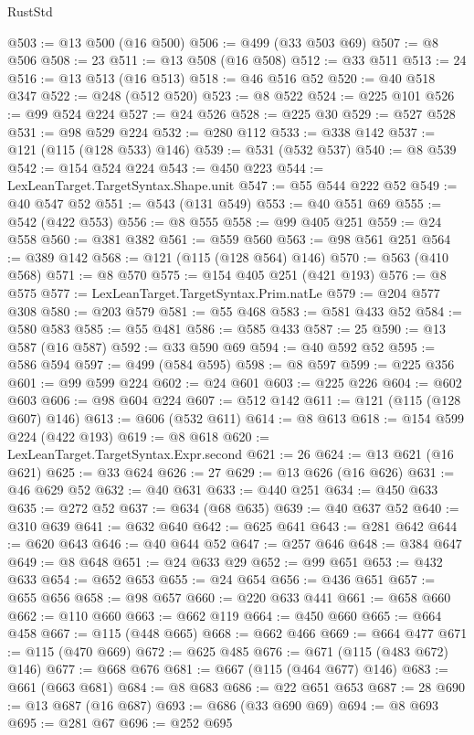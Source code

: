 \begin{lexlean}{RustStd}
\begin{coremodule}
@503 := @13 @500 (@16 @500)
@506 := @499 (@33 @503 @69)
@507 := @8 @506
@508 := 23
@511 := @13 @508 (@16 @508)
@512 := @33 @511
@513 := 24
@516 := @13 @513 (@16 @513)
@518 := @46 @516 @52
@520 := @40 @518 @347
@522 := @248 (@512 @520)
@523 := @8 @522
@524 := @225 @101
@526 := @99 @524 @224
@527 := @24 @526
@528 := @225 @30
@529 := @527 @528
@531 := @98 @529 @224
@532 := @280 @112
@533 := @338 @142
@537 := @121 (@115 (@128 @533) @146)
@539 := @531 (@532 @537)
@540 := @8 @539
@542 := @154 @524 @224
@543 := @450 @223
@544 := LexLeanTarget.TargetSyntax.Shape.unit
@547 := @55 @544 @222 @52
@549 := @40 @547 @52
@551 := @543 (@131 @549)
@553 := @40 @551 @69
@555 := @542 (@422 @553)
@556 := @8 @555
@558 := @99 @405 @251
@559 := @24 @558
@560 := @381 @382
@561 := @559 @560
@563 := @98 @561 @251
@564 := @389 @142
@568 := @121 (@115 (@128 @564) @146)
@570 := @563 (@410 @568)
@571 := @8 @570
@575 := @154 @405 @251 (@421 @193)
@576 := @8 @575
@577 := LexLeanTarget.TargetSyntax.Prim.natLe
@579 := @204 @577 @308
@580 := @203 @579
@581 := @55 @468
@583 := @581 @433 @52
@584 := @580 @583
@585 := @55 @481
@586 := @585 @433
@587 := 25
@590 := @13 @587 (@16 @587)
@592 := @33 @590 @69
@594 := @40 @592 @52
@595 := @586 @594
@597 := @499 (@584 @595)
@598 := @8 @597
@599 := @225 @356
@601 := @99 @599 @224
@602 := @24 @601
@603 := @225 @226
@604 := @602 @603
@606 := @98 @604 @224
@607 := @512 @142
@611 := @121 (@115 (@128 @607) @146)
@613 := @606 (@532 @611)
@614 := @8 @613
@618 := @154 @599 @224 (@422 @193)
@619 := @8 @618
@620 := LexLeanTarget.TargetSyntax.Expr.second
@621 := 26
@624 := @13 @621 (@16 @621)
@625 := @33 @624
@626 := 27
@629 := @13 @626 (@16 @626)
@631 := @46 @629 @52
@632 := @40 @631
@633 := @440 @251
@634 := @450 @633
@635 := @272 @52
@637 := @634 (@68 @635)
@639 := @40 @637 @52
@640 := @310 @639
@641 := @632 @640
@642 := @625 @641
@643 := @281 @642
@644 := @620 @643
@646 := @40 @644 @52
@647 := @257 @646
@648 := @384 @647
@649 := @8 @648
@651 := @24 @633 @29
@652 := @99 @651
@653 := @432 @633
@654 := @652 @653
@655 := @24 @654
@656 := @436 @651
@657 := @655 @656
@658 := @98 @657
@660 := @220 @633 @441
@661 := @658 @660
@662 := @110 @660
@663 := @662 @119
@664 := @450 @660
@665 := @664 @458
@667 := @115 (@448 @665)
@668 := @662 @466
@669 := @664 @477
@671 := @115 (@470 @669)
@672 := @625 @485
@676 := @671 (@115 (@483 @672) @146)
@677 := @668 @676
@681 := @667 (@115 (@464 @677) @146)
@683 := @661 (@663 @681)
@684 := @8 @683
@686 := @22 @651 @653
@687 := 28
@690 := @13 @687 (@16 @687)
@693 := @686 (@33 @690 @69)
@694 := @8 @693
@695 := @281 @67
@696 := @252 @695

\end{coremodule}
\end{lexlean}
